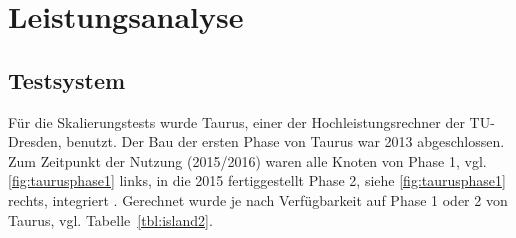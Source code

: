 \chapter{Leistungsanalyse}
\label{sct:benchmarks}

\section{Testsystem}
\label{sct:taurus}


Für die Skalierungstests wurde Taurus, einer der Hochleistungsrechner der TU-Dresden, benutzt.
Der Bau der ersten Phase von Taurus war 2013 abgeschlossen\cite{taurusnutzerschulung}.
Zum Zeitpunkt der Nutzung (2015/2016) waren alle Knoten von Phase 1, vgl. \autoref{fig:taurusphase1} links, in die 2015 fertiggestellt\cite{heisehrsk2} Phase 2, siehe \autoref{fig:taurusphase1} rechts, integriert \cite{doctudtaurushardware}. Gerechnet wurde je nach Verfügbarkeit auf Phase 1 oder 2 von Taurus, vgl. Tabelle~\ref{tbl:island2}.

